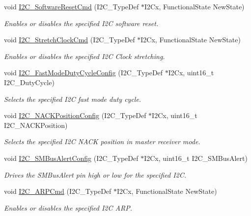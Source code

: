 \begin{DoxyCompactItemize}
void \hyperlink{group___i2_c_ga1289c908aeb882443aba323b459c638b}{I2\-C\-\_\-\-Software\-Reset\-Cmd} (I2\-C\-\_\-\-Type\-Def $\ast$I2\-Cx, Functional\-State New\-State)
\begin{DoxyCompactList}\small\item\em Enables or disables the specified I2\-C software reset. \end{DoxyCompactList}\item 
void \hyperlink{group___i2_c_ga7459feb3b1dfcd3e4f6574002ca7d3bd}{I2\-C\-\_\-\-Stretch\-Clock\-Cmd} (I2\-C\-\_\-\-Type\-Def $\ast$I2\-Cx, Functional\-State New\-State)
\begin{DoxyCompactList}\small\item\em Enables or disables the specified I2\-C Clock stretching. \end{DoxyCompactList}\item 
void \hyperlink{group___i2_c_gaa570f76bc34e5b0531b29b1a90af1275}{I2\-C\-\_\-\-Fast\-Mode\-Duty\-Cycle\-Config} (I2\-C\-\_\-\-Type\-Def $\ast$I2\-Cx, uint16\-\_\-t I2\-C\-\_\-\-Duty\-Cycle)
\begin{DoxyCompactList}\small\item\em Selects the specified I2\-C fast mode duty cycle. \end{DoxyCompactList}\item 
void \hyperlink{group___i2_c_gad08ebffc3a234d84e6405ec115bd74f1}{I2\-C\-\_\-\-N\-A\-C\-K\-Position\-Config} (I2\-C\-\_\-\-Type\-Def $\ast$I2\-Cx, uint16\-\_\-t I2\-C\-\_\-\-N\-A\-C\-K\-Position)
\begin{DoxyCompactList}\small\item\em Selects the specified I2\-C N\-A\-C\-K position in master receiver mode. \end{DoxyCompactList}\item 
void \hyperlink{group___i2_c_ga75a810776d9710d2f6d9c5d9e93241c6}{I2\-C\-\_\-\-S\-M\-Bus\-Alert\-Config} (I2\-C\-\_\-\-Type\-Def $\ast$I2\-Cx, uint16\-\_\-t I2\-C\-\_\-\-S\-M\-Bus\-Alert)
\begin{DoxyCompactList}\small\item\em Drives the S\-M\-Bus\-Alert pin high or low for the specified I2\-C. \end{DoxyCompactList}\item 
void \hyperlink{group___i2_c_ga66d86742bf1be58b17ef8779ffc79d02}{I2\-C\-\_\-\-A\-R\-P\-Cmd} (I2\-C\-\_\-\-Type\-Def $\ast$I2\-Cx, Functional\-State New\-State)
\begin{DoxyCompactList}\small\item\em Enables or disables the specified I2\-C A\-R\-P. \end{DoxyCompactList}\item 

\end{DoxyCompactItemize}
